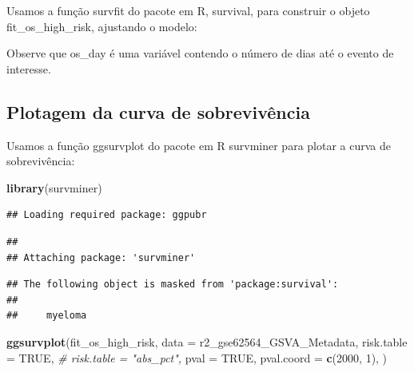 \documentclass[
]{book}
\newenvironment{Shaded}{\begin{snugshade}}{\end{snugshade}}
\newcommand{\AttributeTok}[1]{\textcolor[rgb]{0.13,0.29,0.53}{#1}}
\newcommand{\CommentTok}[1]{\textcolor[rgb]{0.56,0.35,0.01}{\textit{#1}}}
\newcommand{\ConstantTok}[1]{\textcolor[rgb]{0.56,0.35,0.01}{#1}}
\newcommand{\DecValTok}[1]{\textcolor[rgb]{0.00,0.00,0.81}{#1}}
\newcommand{\FunctionTok}[1]{\textcolor[rgb]{0.13,0.29,0.53}{\textbf{#1}}}
\newcommand{\NormalTok}[1]{#1}
\newcommand{\OtherTok}[1]{\textcolor[rgb]{0.56,0.35,0.01}{#1}}
\newcommand{\SpecialCharTok}[1]{\textcolor[rgb]{0.81,0.36,0.00}{\textbf{#1}}}
\begin{document}
Usamos a função survfit do pacote em R, survival, para construir o objeto fit\_os\_high\_risk, ajustando o modelo:

\begin{Shaded}
\end{Shaded}

Observe que os\_day é uma variável contendo o número de dias até o evento de interesse.

\subsection{Plotagem da curva de sobrevivência}\label{plotagem-da-curva-de-sobrevivuxeancia}

Usamos a função ggsurvplot do pacote em R survminer para plotar a curva de sobrevivência:

\begin{Shaded}
\begin{Highlighting}[]
\FunctionTok{library}\NormalTok{(survminer)}
\end{Highlighting}
\end{Shaded}

\begin{verbatim}
## Loading required package: ggpubr
\end{verbatim}

\begin{verbatim}
## 
## Attaching package: 'survminer'
\end{verbatim}

\begin{verbatim}
## The following object is masked from 'package:survival':
## 
##     myeloma
\end{verbatim}

\begin{Shaded}
\begin{Highlighting}[]
\FunctionTok{ggsurvplot}\NormalTok{(fit\_os\_high\_risk, }
           \AttributeTok{data =}\NormalTok{ r2\_gse62564\_GSVA\_Metadata, }
           \AttributeTok{risk.table =} \ConstantTok{TRUE}\NormalTok{,}
           \CommentTok{\# risk.table = "abs\_pct",}
           \AttributeTok{pval =} \ConstantTok{TRUE}\NormalTok{, }
           \AttributeTok{pval.coord =} \FunctionTok{c}\NormalTok{(}\DecValTok{2000}\NormalTok{, }\DecValTok{1}\NormalTok{),}
\NormalTok{           )}
\end{Highlighting}
\end{Shaded}
\end{document}
